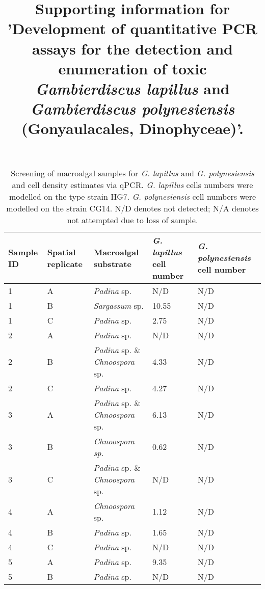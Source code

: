 \documentclass[12pt]{article}
\title{Supporting information for 'Development of quantitative PCR assays for the detection and enumeration of toxic \emph{Gambierdiscus lapillus} and \emph{Gambierdiscus polynesiensis} (Gonyaulacales, Dinophyceae)'.}
\date{}
\begin{document}
\maketitle
\FloatBarrier
\begin{longtable}{ | p{2cm} | p{2cm} | p{3cm} | p{3.5cm} | p{3.5cm} | }
\caption{Screening of macroalgal samples for \emph{G. lapillus} and \emph{G. polynesiensis} and cell density estimates via qPCR. \emph{G. lapillus} cells numbers were modelled on the type strain HG7. \emph{G. polynesiensis} cell numbers were modelled on the strain CG14. N/D denotes not detected; N/A denotes not attempted due to loss of sample.}\\
\hline
\label{tbl:MacroalgaeTable}
\textbf{Sample ID}&\textbf{Spatial replicate}&\textbf{Macroalgal substrate}&\textbf{\textit{G. lapillus} cell number}&\textbf{\textit{G. polynesiensis} cell number}\\
\hline
1&A&\emph{Padina} sp.&N/D&N/D\\
\hline
1&B&\emph{Sargassum} sp.&10.55
&N/D\\
\hline
1&C&\emph{Padina} sp.&2.75
&N/D\\
\hline
2&A&\emph{Padina} sp.&N/D&N/D\\
\hline
2&B&\emph{Padina} sp. \& \emph{Chnoospora} sp.&4.33&N/D\\
\hline
2&C&\emph{Padina} sp.&4.27&N/D\\
\hline
\hline
\hline
3&A&\emph{Padina} sp. \& \emph{Chnoospora} sp.&6.13 %
&N/D\\
\hline
3&B&\emph{Chnoospora sp.}&0.62
&N/D\\
\hline
3&C&\emph{Padina} sp. \& \emph{Chnoospora} sp.&N/D&N/D\\
\hline
4&A&\emph{Chnoospora} sp.&1.12 %
&N/D\\
\hline
4&B&\emph{Padina} sp.&1.65
&N/D\\
\hline
4&C&\emph{Padina} sp.&N/D&N/D\\
\hline
5
&A&\emph{Padina} sp.&9.35&N/D\\
\hline
5
&B&\emph{Padina} sp.&N/D&N/D\\

\end{longtable}
\end{document}
